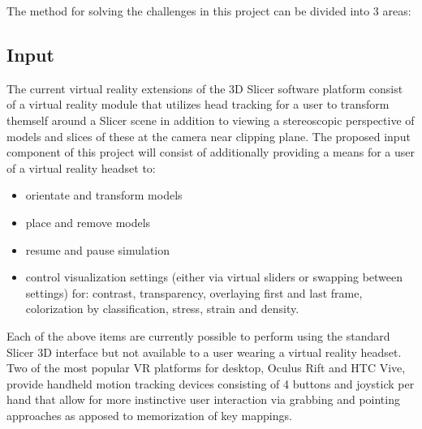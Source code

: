 \begin{comment}
Compiler Suite
* CMake
* Visual Studio 15 2017 Win64
* CMake 3.17.0-rc2
* Qt 5.13.0
\end{comment}


\label{section:methods}

The method for solving the challenges in this project can be divided into 3 areas:

\subsection{Input}
The current virtual reality extensions of the 3D Slicer software platform consist of a virtual reality module that utilizes head tracking for a user to transform themself around a Slicer scene in addition to viewing a stereoscopic perspective of models and slices of these at the camera near clipping plane. The proposed input component of this project will consist of additionally providing a means for a user of a virtual reality headset to:

\begin{itemize}
  \item orientate and transform models
  \item place and remove models
  \item resume and pause simulation
  \item control visualization settings (either via virtual sliders or swapping between settings) for: contrast, transparency, overlaying first and last frame, colorization by classification, stress, strain and density.
\end{itemize}

Each of the above items are currently possible to perform using the standard Slicer 3D interface but not available to a user wearing a virtual reality headset. Two of the most popular VR platforms for desktop, Oculus Rift and HTC Vive, provide handheld motion tracking devices consisting of 4 buttons and joystick per hand that allow for more instinctive user interaction via grabbing and pointing approaches as apposed to memorization of key mappings.

